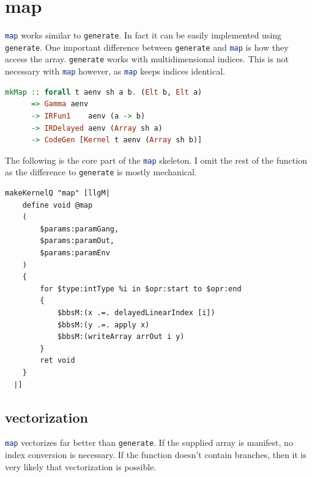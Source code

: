 \documentclass[a4paper,bibliography=totocnumbered,parskip,headsepline]{scrbook}
\begin{document}
\section{map}
\lstinline[language=haskell]!map! works similar to \lstinline[language=haskell]!generate!.
In fact it can be easily implemented using \lstinline[language=haskell]!generate!.
One important difference between \lstinline[language=haskell]!generate! and \lstinline[language=haskell]!map! is how they access the array.
\lstinline[language=haskell]!generate! works with multidimensional indices.
This is not necessary with \lstinline[language=haskell]!map! however, as \lstinline[language=haskell]!map! keeps indices identical.

\begin{lstlisting}[language=haskell]
mkMap :: forall t aenv sh a b. (Elt b, Elt a)
      => Gamma aenv
      -> IRFun1    aenv (a -> b)
      -> IRDelayed aenv (Array sh a)
      -> CodeGen [Kernel t aenv (Array sh b)]
\end{lstlisting}
The following is the core part of the \lstinline[language=haskell]!map! skeleton.
I omit the rest of the function as the difference to \lstinline[language=haskell]!generate! is mostly mechanical.
\begin{lstlisting}
makeKernelQ "map" [llgM|
    define void @map
    (
        $params:paramGang,
        $params:paramOut,
        $params:paramEnv
    )
    {
        for $type:intType %i in $opr:start to $opr:end
        {
            $bbsM:(x .=. delayedLinearIndex [i])
            $bbsM:(y .=. apply x)
            $bbsM:(writeArray arrOut i y)
        }
        ret void
    }
  |]
\end{lstlisting}

\subsection*{vectorization}
\lstinline[language=haskell]!map! vectorizes far better than \lstinline[language=haskell]!generate!.
If the supplied array is manifest, no index conversion is necessary.
If the function doesn't contain branches, then it is very likely that vectorization is possible.
\end{document}
